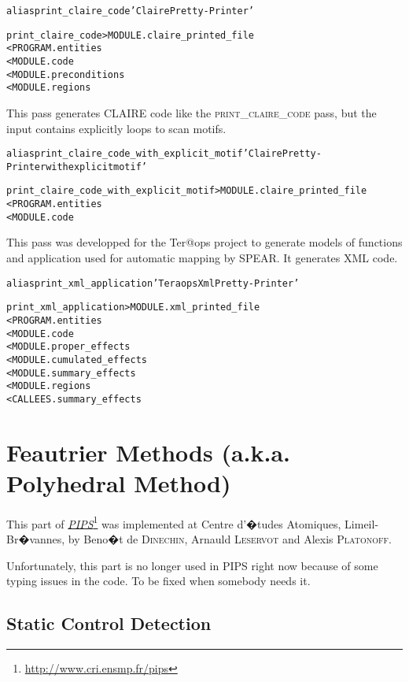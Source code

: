 \documentclass[a4paper]{report}
\newenvironment{PipsMake}{\begin{alltt}}{\end{alltt}}
\newcommand{\LINK}[2]{\href{#2}{#1}\footnote{\url{#2}}\xspace}
\newcommand{\PIPS}{\LINK{\emph{PIPS}}{http://www.cri.ensmp.fr/pips}}
\begin{document}
\begin{PipsMake}
alias print_claire_code 'Claire Pretty-Printer'

print_claire_code        > MODULE.claire_printed_file
        < PROGRAM.entities
        < MODULE.code
        < MODULE.preconditions
        < MODULE.regions
\end{PipsMake}


This pass generates CLAIRE code like the \textsc{print\_claire\_code}
pass, but the input contains explicitly loops to scan motifs.

\begin{PipsMake}
alias print_claire_code_with_explicit_motif 'Claire Pretty-Printer with explicit motif'

print_claire_code_with_explicit_motif       > MODULE.claire_printed_file
        < PROGRAM.entities
        < MODULE.code
\end{PipsMake}


This pass was developped for the Ter@ops project to generate models
of functions and application used for automatic mapping by SPEAR.
It generates XML code.

\begin{PipsMake}
alias print_xml_application 'Teraops Xml Pretty-Printer'

print_xml_application      > MODULE.xml_printed_file
    < PROGRAM.entities
    < MODULE.code
    < MODULE.proper_effects
    < MODULE.cumulated_effects
    < MODULE.summary_effects
    < MODULE.regions      
    < CALLEES.summary_effects
\end{PipsMake}

\chapter{Feautrier Methods (a.k.a. Polyhedral Method)}
\label{section-feautrier-methods}

This part of \PIPS{} was implemented at Centre d'�tudes Atomiques,
Limeil-Br�vannes, by Beno�t de \textsc{Dinechin}, Arnauld
\textsc{Leservot} and Alexis \textsc{Platonoff}.

Unfortunately, this part is no longer used in PIPS right now because of
some typing issues in the code. To be fixed when somebody needs it.


\section{Static Control Detection}
\label{subsection-static-control-detection}
\end{document}
